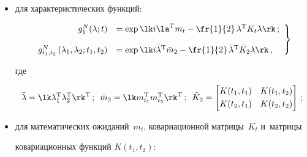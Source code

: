\begin{itemize}

\item для характеристических функций:

     \begin{equation}

     \left.

     \begin{array}{rl}

     g_1^N (\lambda;t)& =\exp \lk i\la^T m_t - \fr{1}{2}\, \lambda^{\mathrm{T}}

     K_t \lambda\rk\,;\\[12pt]

    g_{t_1, t_2}^N \left(\lambda_1, \lambda_2;t_1, t_2 \right)& =

    \exp \lk i\bar \lambda^{\mathrm{T}} \bar m_2 - \fr{1}{2}\, 

    \bar \lambda^{\mathrm{T}} \bar K_2 \lambda\rk\,,

    \end{array}

    \right\}

    \label{e5.3-sin}

    \end{equation}

    где

    $$

    \bar \lambda =\lk \lambda_1^{\mathrm{T}}\lambda_2^{\mathrm{T}}\rk^{\mathrm{T}}\,; 

    \enskip\bar m_2 = \lk m_{t_1}^{\mathrm{T}} m_{t_2}^{\mathrm{T}}\rk^{\mathrm{T}}\,;

    \enskip 

    \bar K_2= \begin{bmatrix}

    K(t_1, t_1)& K(t_1, t_2)\\[3pt]

    K(t_2, t_1)& K(t_2, t_2)

    \end{bmatrix}\,;

    $$



\item для математических ожиданий~$m_t$, ковариационной матрицы~$K_t$ и~матрицы 

ковариационных функций $K(t_1, t_2)$:

    \begin{equation}

    \left.


\end{equation}
\end{itemize}

